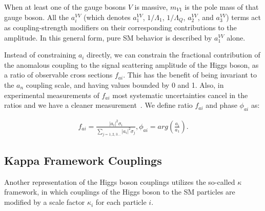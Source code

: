 When at least one of the gauge bosons $V$ is massive, $m_{V1}$ is the pole mass of that gauge boson. All the $a_i^{VV}$ (which denotes $a_{1}^{VV}$, $1/\Lambda_{1}$, $1/\Lambda_{Q}$, $a_{2}^{VV}$, and $a_{3}^{VV}$) terms act as coupling-strength modifiers on their corresponding contributions to the amplitude. In this general form, pure SM behavior is described by $a_{1}^{VV}$ alone.


Instead of constraining $a_i$ directly, we can constrain the fractional contribution of the anomalous coupling to the signal scattering amplitude of the Higgs boson, as a ratio of observable cross sections $f_{ai}$. This has the benefit of being invariant to the $a_n$ coupling scale, and having values bounded by 0 and 1. Also, in experimental measurements of $f_{ai}$ most systematic uncertainties cancel in the ratios and we have a cleaner measurement~\cite{2020}. We define ratio $f_{ai}$ and phase $\phi_{ai}$ as:

\begin{equation}
\label{eq:faiandphase}
\begin{gathered}
f_{ai} = \frac{|a_i|^2 \sigma_i}{\sum_{j=1,2,3...}|a_i|^2 \sigma_j},   \phi_{ai} = arg(\frac{a_i}{a_1}).
\end{gathered}
\end{equation}

\subsection{Kappa Framework Couplings} \label{sec:kappa}

Another representation of the Higgs boson couplings utilizes the so-called $\kappa$ framework, in which couplings of 
the Higgs boson to the SM particles are modified by a scale factor $\kappa_i$ for each particle $i$.


